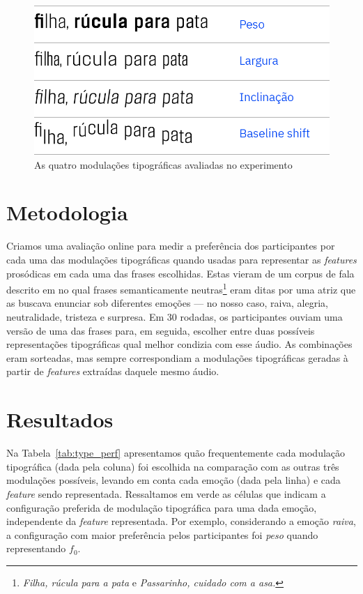 \documentclass[11pt]{article}
\begin{document}
\begin{figure}[H]
     {\centering
    \includegraphics[width=\linewidth]{fig/mod2.png}
     \caption{As quatro modulações tipográficas avaliadas no experimento}
     \label{fig:type_modulations}\par}
\end{figure}
  
  \section{Metodologia}
  \label{sec:metodologia}
 
 Criamos uma avaliação online para medir a preferência dos participantes por cada uma das modulações tipográficas quando usadas para representar as {\itshape features} prosódicas em cada uma das frases escolhidas. Estas vieram de um corpus de fala descrito em \cite{pdpcosta2015} no qual frases semanticamente neutras\footnote{{\itshape Filha, rúcula para a pata} e {\itshape Passarinho, cuidado com a asa.}} eram ditas por uma atriz que as buscava enunciar sob diferentes emoções --- no nosso caso, raiva, alegria, neutralidade, tristeza e surpresa. Em 30 rodadas, os participantes ouviam uma versão de uma das frases para, em seguida, escolher entre duas possíveis representações tipográficas qual melhor condizia com esse áudio. As combinações eram sorteadas, mas sempre correspondiam a modulações tipográficas geradas à partir de {\itshape features} extraídas daquele mesmo áudio.
  


\section{Resultados}
  \label{sec:resultados}
  
  Na Tabela~\ref{tab:type_perf} apresentamos quão frequentemente cada modulação tipográfica (dada pela coluna) foi escolhida na comparação com as outras três modulações possíveis, levando em conta cada emoção (dada pela linha) e cada {\itshape feature} sendo representada. Ressaltamos em verde as células que indicam a configuração preferida de modulação tipográfica para uma dada emoção, independente da {\itshape feature} representada. Por exemplo, considerando a emoção {\itshape raiva}, a configuração com maior preferência pelos participantes foi {\itshape peso} quando representando $f_0$.
  
\end{document}
